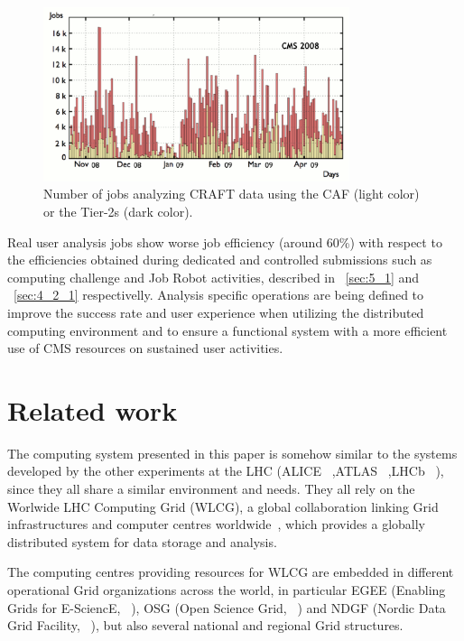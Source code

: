 \begin{figure}
\centering
\includegraphics[width=0.80\textwidth]{CRAFTjobs.eps}
\caption{Number of jobs analyzing CRAFT data using the CAF (light color) or the Tier-2s (dark color).}
\label{fig:CRAFTjobs}
\end{figure}


Real user analysis jobs show worse job efficiency (around 60\%) with respect to the efficiencies obtained during dedicated and controlled submissions such 
as computing challenge and Job Robot activities, described in ~\ref{sec:5_1} and ~\ref{sec:4_2_1} respectivelly.
Analysis specific operations are being defined to improve the success rate and user experience when utilizing the distributed computing environment and to ensure a functional system with a more efficient use of CMS resources on sustained user activities.

\section{Related work}
The computing system presented in this paper is somehow similar to the systems developed 
by the other experiments at the LHC (ALICE ~\cite{RefALICETDR},ATLAS ~\cite{RefATLASTDR},LHCb ~\cite{RefLHCbTDR}), since they all share a similar environment and needs. They all rely on the Worlwide LHC Computing Grid (WLCG), a global collaboration linking Grid infrastructures and computer centres worldwide~\cite{RefWLCG}, which provides a globally distributed system for data storage and analysis.

The computing centres providing resources for WLCG are embedded in different
operational Grid organizations across the world, in particular  EGEE (Enabling
Grids for E-SciencE, ~\cite{RefEGEE}), OSG (Open Science Grid, ~\cite{RefOSG}) and NDGF (Nordic Data Grid Facility, ~\cite{RefNDGF}), but also several national and regional Grid structures.

